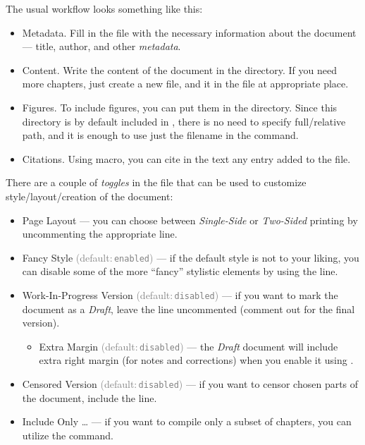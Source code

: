 The usual workflow looks something like this:
\begin{itemize}
    \item \textsf{Metadata.} Fill in the  file with the necessary information about the document --- title, author, and other \emph{metadata}.
    \item \textsf{Content.} Write the content of the document in the  directory.
          If you need more chapters, just create a new file, and \macro{} it in the  file at appropriate place.
    \item \textsf{Figures.} To include figures, you can put them in the  directory.
          Since this directory is by default included in \macro{\graphicspath}, there is no need to specify full/relative path, and it is enough to use just the filename in the  command.
    \item \textsf{Citations.} Using  \macro{\autocite} macro, you can cite in the text any entry added to the  file.
\end{itemize}

\begin{remark}[Toggles]
    There are a couple of \emph{toggles} in the  file that can be used to customize style/layout/creation of the document:
    \begin{itemize}
        \item \textsf{Page Layout} --- you can choose between \emph{Single-Side} or \emph{Two-Sided} printing by uncommenting the appropriate \macro{\documentclass} line.
        \item \textsf{Fancy Style} \textcolor{gray}{(default:\,\texttt{enabled})} --- if the default style is not to your liking, you can disable some of the more \enquote{fancy} stylistic elements by using the \custommacro{\FANCYfalse} line.
        \item \textsf{Work-In-Progress Version} \textcolor{gray}{(default:\,\texttt{disabled})} --- if you want to mark the document as a \emph{Draft}, leave the \custommacro{\WIPtrue} line uncommented (comment out for the final version).
              \begin{itemize}
                  \item \textsf{Extra Margin} \textcolor{gray}{(default:\,\texttt{disabled})} --- the \emph{Draft} document will include extra right margin (for notes and corrections) when you enable it using \custommacro{\EXTRAMARGINtrue}.
              \end{itemize}
        \item \textsf{Censored Version} \textcolor{gray}{(default:\,\texttt{disabled})} --- if you want to censor chosen parts of the document, include the \custommacro{\CENSORtrue} line.
        \item \textsf{Include Only \ldots{}} --- if you want to compile only a subset of chapters, you can utilize the  command. \qedhere*
    \end{itemize}
\end{remark}

